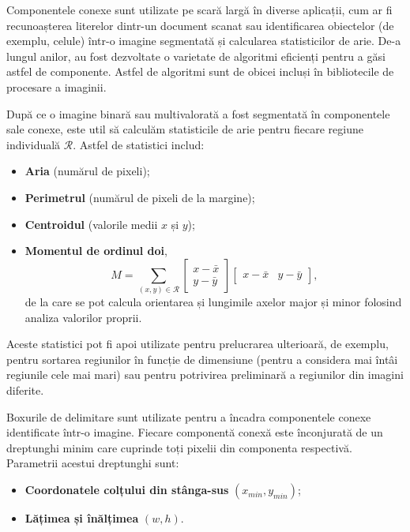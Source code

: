 \documentclass[a4paper,12pt]{report}
\begin{document}
Componentele conexe sunt utilizate pe scară largă în diverse aplicații, cum ar fi recunoașterea literelor dintr-un document scanat sau identificarea obiectelor (de exemplu, celule) într-o imagine segmentată și calcularea statisticilor de arie. De-a lungul anilor, au fost dezvoltate o varietate de algoritmi eficienți pentru a găsi astfel de componente. Astfel de algoritmi sunt de obicei incluși în bibliotecile de procesare a imaginii.

După ce o imagine binară sau multivalorată a fost segmentată în componentele sale conexe, este util să calculăm statisticile de arie pentru fiecare regiune individuală $\mathcal{R}$. Astfel de statistici includ:
\begin{itemize}
    \item \textbf{Aria} (numărul de pixeli);
    \item \textbf{Perimetrul} (numărul de pixeli de la margine);
    \item \textbf{Centroidul} (valorile medii $x$ și $y$);
    \item \textbf{Momentul de ordinul doi},
          \[
              M = \sum_{(x,y) \in \mathcal{R}} \begin{bmatrix}
                  x - \bar{x} \\
                  y - \bar{y}
              \end{bmatrix}
              \begin{bmatrix}
                  x - \bar{x} & y - \bar{y}
              \end{bmatrix},
          \]
          de la care se pot calcula orientarea și lungimile axelor major și minor folosind analiza valorilor proprii.
\end{itemize}

Aceste statistici pot fi apoi utilizate pentru prelucrarea ulterioară, de exemplu, pentru sortarea regiunilor în funcție de dimensiune (pentru a considera mai întâi regiunile cele mai mari) sau pentru potrivirea preliminară a regiunilor din imagini diferite.

Boxurile de delimitare sunt utilizate pentru a încadra componentele conexe identificate într-o imagine. Fiecare componentă conexă este înconjurată de un dreptunghi minim care cuprinde toți pixelii din componenta respectivă. Parametrii acestui dreptunghi sunt:
\begin{itemize}
    \item \textbf{Coordonatele colțului din stânga-sus} $(x_{min}, y_{min})$;
    \item \textbf{Lățimea și înălțimea} $(w, h)$.
\end{itemize}
\end{document}
